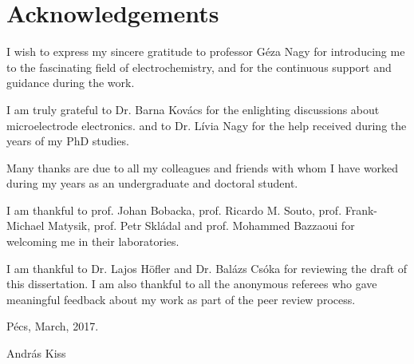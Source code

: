 \chapter*{Acknowledgements}
I wish to express my sincere gratitude to professor Géza Nagy for introducing me to the fascinating field of electrochemistry, and for the continuous support and guidance during the work. 

\vspace{5mm}

I am truly grateful to Dr. Barna Kovács for the enlighting discussions about microelectrode electronics. and to Dr. Lívia Nagy for the help received during the years of my PhD studies.

\vspace{5mm}

Many thanks are due to all my colleagues and friends with whom I have worked during my years as an undergraduate and doctoral student.

\vspace{5mm}

I am thankful to prof. Johan Bobacka, prof. Ricardo M. Souto, prof. Frank-Michael Matysik, prof. Petr Skládal and prof. Mohammed Bazzaoui for welcoming me in their laboratories.

\vspace{5mm}

I am thankful to Dr. Lajos Höfler and Dr. Balázs Csóka for reviewing the draft of this dissertation. I am also thankful to all the anonymous referees who gave meaningful feedback about my work as part of the peer review process.

\vspace{20mm}

Pécs, March, 2017.

\vspace{5mm}

András Kiss
